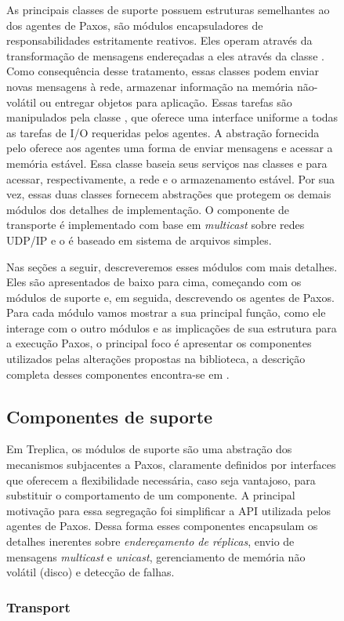 \begin{figure}[ht]
As principais classes de suporte possuem estruturas semelhantes ao dos agentes de Paxos,
são módulos encapsuladores de responsabilidades estritamente reativos. Eles operam através
da transformação de mensagens endereçadas a eles através da classe .
Como consequência desse tratamento, essas classes podem enviar novas mensagens à rede,
armazenar informação na memória não-volátil ou entregar objetos para aplicação. Essas
tarefas são manipulados pela classe , que oferece uma interface
uniforme a todas as tarefas de I/O requeridas pelos agentes. A abstração fornecida pelo
 oferece aos agentes uma forma de enviar mensagens e acessar a
memória estável. Essa classe baseia seus serviços nas classes  e
 para acessar, respectivamente, a rede e o armazenamento estável. Por
sua vez, essas duas classes fornecem abstrações que protegem os demais módulos dos
detalhes de implementação. O componente de transporte é implementado com base em
\emph{multicast} sobre redes UDP/IP e o  é baseado em sistema de
arquivos simples.

Nas seções a seguir, descreveremos esses módulos com mais detalhes. Eles são apresentados
de baixo para cima, começando com os módulos de suporte e, em seguida, descrevendo os
agentes de Paxos. Para cada módulo vamos mostrar a sua principal função, como ele interage
com o outro módulos e as implicações de sua estrutura para a execução Paxos, o principal
foco é apresentar os componentes utilizados pelas alterações propostas na biblioteca, a
descrição completa desses componentes encontra-se em \cite{vieira-tr10b}.

\subsection{Componentes de suporte}

Em Treplica, os módulos de suporte são uma abstração dos mecanismos subjacentes a Paxos,
claramente definidos por interfaces que oferecem a flexibilidade necessária, caso seja
vantajoso, para substituir o comportamento de um componente. A principal motivação para
essa segregação foi simplificar a API utilizada pelos agentes de Paxos. Dessa forma esses
componentes encapsulam os detalhes inerentes sobre \emph{endereçamento de réplicas}, envio
de mensagens \emph{multicast} e \emph{unicast}, gerenciamento de memória não volátil
(disco) e detecção de falhas.

\subsubsection{Transport}\label{subsec:transport}


\end{figure}
